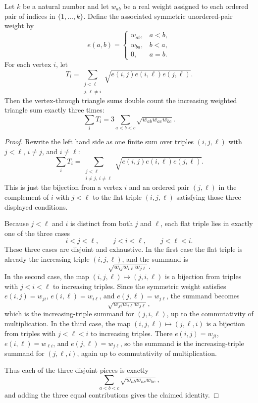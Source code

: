 \begin{helper}
Let $k$ be a natural number and let $w_{ab}$ be a real weight assigned to
each ordered pair of indices in $\{1,\ldots,k\}$.  Define the associated
symmetric unordered-pair weight by
\[
e(a,b)=
\begin{cases}
w_{ab},&a<b,\\
w_{ba},&b<a,\\
0,&a=b.
\end{cases}
\]
For each vertex $i$, let
\[
T_i=\sum_{\substack{j<\ell\\j,\ell\ne i}}
\sqrt{e(i,j)e(i,\ell)e(j,\ell)}.
\]
Then the vertex-through triangle sums double count the increasing weighted
triangle sum exactly three times:
\[
\sum_i T_i
=3\sum_{a<b<c}\sqrt{w_{ab}w_{ac}w_{bc}}.
\]
\end{helper}
\begin{proof}
Rewrite the left hand side as one finite sum over triples $(i,j,\ell)$ with
$j<\ell$, $i\ne j$, and $i\ne \ell$:
\[
\sum_i T_i
=
\sum_{\substack{j<\ell\\ i\ne j,\ i\ne \ell}}
\sqrt{e(i,j)e(i,\ell)e(j,\ell)}.
\]
This is just the bijection from a vertex $i$ and an ordered pair
$(j,\ell)$ in the complement of $i$ with $j<\ell$ to the flat triple
$(i,j,\ell)$ satisfying those three displayed conditions.

Because $j<\ell$ and $i$ is distinct from both $j$ and $\ell$, each flat
triple lies in exactly one of the three cases
\[
i<j<\ell,\qquad j<i<\ell,\qquad j<\ell<i.
\]
These three cases are disjoint and exhaustive.  In the first case the flat
triple is already the increasing triple $(i,j,\ell)$, and the summand is
\[
\sqrt{w_{ij}w_{i\ell}w_{j\ell}}.
\]
In the second case, the map $(i,j,\ell)\mapsto (j,i,\ell)$ is a bijection
from triples with $j<i<\ell$ to increasing triples.  Since the symmetric
weight satisfies $e(i,j)=w_{ji}$, $e(i,\ell)=w_{i\ell}$, and
$e(j,\ell)=w_{j\ell}$, the summand becomes
\[
\sqrt{w_{ji}w_{i\ell}w_{j\ell}},
\]
which is the increasing-triple summand for $(j,i,\ell)$, up to the
commutativity of multiplication.  In the third case, the map
$(i,j,\ell)\mapsto (j,\ell,i)$ is a bijection from triples with
$j<\ell<i$ to increasing triples.  There
$e(i,j)=w_{ji}$, $e(i,\ell)=w_{\ell i}$, and $e(j,\ell)=w_{j\ell}$, so the
summand is the increasing-triple summand for $(j,\ell,i)$, again up to
commutativity of multiplication.

Thus each of the three disjoint pieces is exactly
\[
\sum_{a<b<c}\sqrt{w_{ab}w_{ac}w_{bc}},
\]
and adding the three equal contributions gives the claimed identity.
\end{proof}
